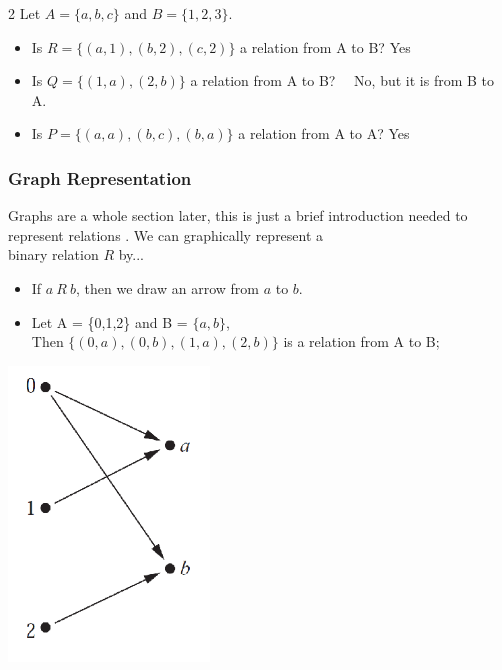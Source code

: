 \documentclass[12pt, letterpaper]{article}
\newcommand{\cul}[1]{%
		\uline{\phantom{#1}}%
		\llap{\contour{white}{#1}}%
	}
\newcommand{\exheader}[1][ex]{{\tiny{#1}\normalsize}}
\begin{document}
\bigbreak

\exheader[2] Let $A = \{a,b,c\}$ and $B = \{1,2,3\}$.
\begin{itemize}[leftmargin=*, label={}]
	\item Is $R = \{(a,1),(b,2),(c,2)\}$ a relation from A to B? \quad \quad Yes 
	\item Is $Q = \{(1,a),(2,b)\}$ a relation from A to B? \quad \quad \quad  \quad \ \ No, but it is from B to A. %
	\item Is $P = \{(a,a), (b,c), (b,a)\}$ a relation from A to A? \quad \quad Yes
\end{itemize}

\pagebreak

\subsubsection{Graph Representation}


\begin{minipage}[t]{0.4\linewidth}
Graphs are a whole section later, this is just a brief introduction needed to represent relations \smiley. \smallbreak
We can graphically represent a \\ binary relation $R$ by...
\begin{itemize}
	\item[] If $a\ R\ b$, then we draw an arrow from $a$ to $b$.
\end{itemize}
\end{minipage} \hspace*{1cm}
\begin{minipage}[t]{0.5\linewidth}
	\cul{Example:}
	\begin{itemize}[leftmargin=*, label={}]
		\item Let A = \{0,1,2\} and B = $\{a,b\}$, \\ Then $\{(0,a), (0,b), (1,a), (2,b)\}$ is a relation from A to B;
	\end{itemize}
	\begin{center}
		\includegraphics[width=0.4\textwidth]{relationgraphex.png}	
	\end{center}
\end{minipage}
\end{document}
